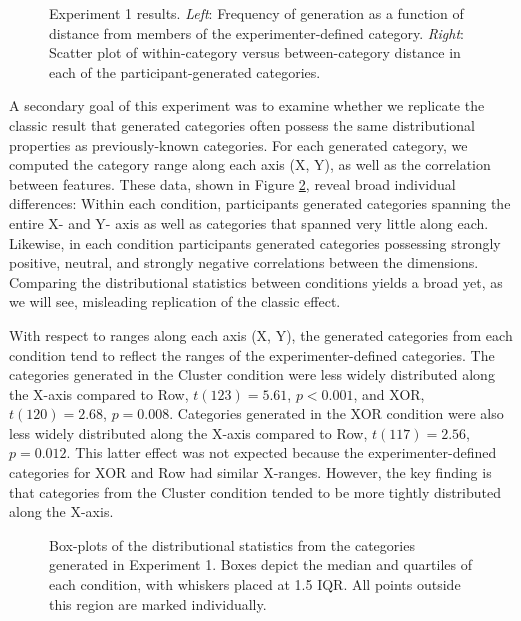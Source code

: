 \documentclass[12pt]{article}
\newcommand\inputpgf[2]{{
\let\pgfimageWithoutPath\pgfimage
\renewcommand{\pgfimage}[2][]{\pgfimageWithoutPath[##1]{#1/##2}}

}}
\begin{document}
\begin{flushleft}
\begin{figure}
    \begin{center}
    \inputpgf{figs/}{e1-distanceplots.pgf}
    \caption{Experiment 1 results. {\em Left}: Frequency of generation as a function of distance from members of the experimenter-defined category. {\em Right}: Scatter plot of within-category versus between-category distance in each of the participant-generated categories.}
    \label{fig:e1-distanceplots}
    \end{center}
\end{figure}

A secondary goal of this experiment was to examine whether we replicate the classic result that generated categories often possess the same distributional properties as previously-known categories. For each generated category, we computed the category range along each axis (X, Y), as well as the correlation between features. These data, shown in Figure \ref{fig:e1-statsboxes}, reveal broad individual differences: Within each condition, participants generated categories spanning the entire X- and Y- axis as well as categories that spanned very little along each. Likewise, in each condition participants generated categories possessing strongly positive, neutral, and strongly negative correlations between the dimensions. Comparing the distributional statistics between conditions yields a broad yet, as we will see, misleading replication of the classic effect. 

With respect to ranges along each axis (X, Y), the generated categories from each condition tend to reflect the ranges of the experimenter-defined categories. The categories generated in the Cluster condition were less widely distributed along the X-axis compared to Row, $t(123) = 5.61$, $p < 0.001$, and XOR, $t(120) = 2.68$, $p = 0.008$. Categories generated in the XOR condition were also less widely distributed along the X-axis compared to Row, $t(117) = 2.56$, $p = 0.012$. This latter effect was not expected because the experimenter-defined categories for XOR and Row had similar X-ranges. However, the key finding is that categories from the Cluster condition tended to be more tightly distributed along the X-axis.

\begin{figure}
    \begin{center}
    \inputpgf{figs/}{e1-statsboxes.pgf}
    \caption{Box-plots of the distributional statistics from the categories generated in Experiment 1. Boxes depict the median and quartiles of each condition, with whiskers placed at 1.5 IQR. All points outside this region are marked individually.}
    \label{fig:e1-statsboxes}
    \end{center}
\end{figure}



\end{flushleft}
\end{document}
